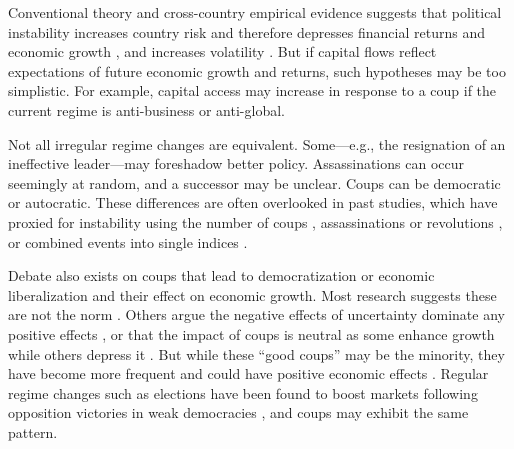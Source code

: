 \documentclass[12pt,final,fleqn]{article}
\theoremstyle{plain}
\begin{document}
Conventional theory and cross-country empirical evidence suggests that political instability increases country risk and therefore depresses financial returns and economic growth \citep{irshad2017relationship, le2006political, lensink2000capital, boutchkova2012precarious, lehkonen2015democracy}, and increases volatility \citep{irshad2017relationship, bialkowski2008stock, leblang2005government, jensen2005market, liu2015economic}. But if capital flows reflect expectations of future economic growth and returns, such hypotheses may be too simplistic. For example, capital access may increase in response to a coup if the current regime is anti-business or anti-global.


Not all irregular regime changes are equivalent. Some---e.g., the resignation of an ineffective leader---may foreshadow better policy. Assassinations can occur seemingly at random, and a successor may be unclear. Coups can be democratic or autocratic. These differences are often overlooked in past studies, which have proxied for instability using the number of coups \citep{londregan1990poverty, alesina1996political}, assassinations or revolutions \citep{barro1991economic}, or combined events into single indices \citep{alesina1996income, venieris1986income, gupta1990economics, jong2009measurement}. 


Debate also exists on coups that lead to democratization or economic liberalization and their effect on economic growth.  Most research suggests these are not the norm \citep{derpanopoulos2015coups, powell2011global, thyne2016coup, varol2011democratic}. Others argue the negative effects of uncertainty dominate any positive effects \citep{alesina1996political}, or that the impact of coups is neutral as some enhance growth while others depress it \citep{londregan1990poverty}. But while these ``good coups'' may be the minority, they have become more frequent \citep{marinov2014coups} and could have positive economic effects \citep{meyersson2016political, girardi2018institution}. Regular regime changes such as elections have been found to boost markets following opposition victories in weak democracies \citep{pantzalis2000political}, and coups may exhibit the same pattern. 
\end{document}
